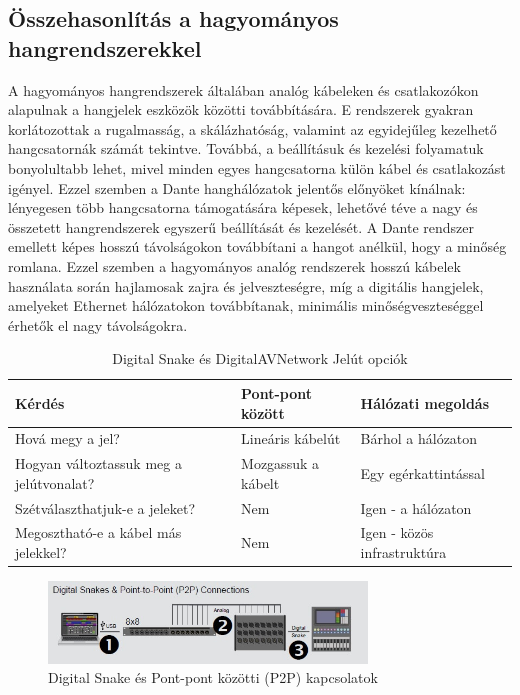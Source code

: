 \subsection{Összehasonlítás a hagyományos hangrendszerekkel}
A hagyományos hangrendszerek általában analóg kábeleken és csatlakozókon alapulnak 
a hangjelek eszközök közötti továbbítására. E rendszerek gyakran korlátozottak 
a rugalmasság, a skálázhatóság, valamint az egyidejűleg kezelhető hangcsatornák 
számát tekintve. Továbbá, a beállításuk és kezelési folyamatuk bonyolultabb lehet, 
mivel minden egyes hangcsatorna külön kábel és csatlakozást igényel. Ezzel szemben 
a Dante hanghálózatok jelentős előnyöket kínálnak: lényegesen több hangcsatorna 
támogatására képesek, lehetővé téve a nagy és összetett hangrendszerek egyszerű 
beállítását és kezelését. A Dante rendszer emellett képes hosszú távolságokon 
továbbítani a hangot anélkül, hogy a minőség romlana. Ezzel szemben a hagyományos 
analóg rendszerek hosszú kábelek használata során hajlamosak zajra és jelveszteségre, 
míg a digitális hangjelek, amelyeket Ethernet hálózatokon továbbítanak, minimális 
minőségveszteséggel érhetők el nagy távolságokra.
\begin{table}[htbp]
    \centering
    \caption{Digital Snake és DigitalAVNetwork Jelút opciók}
    \begin{tabular}{@{}lll@{}}
        \toprule
        \textbf{Kérdés} & \textbf{Pont-pont között} & \textbf{Hálózati megoldás} \\ \midrule
        Hová megy a jel? & Lineáris kábelút & Bárhol a hálózaton \\
        Hogyan változtassuk meg a jelútvonalat? & Mozgassuk a kábelt & Egy egérkattintással \\
        Szétválaszthatjuk-e a jeleket? & Nem & Igen - a hálózaton \\
        Megosztható-e a kábel más jelekkel? & Nem & Igen - közös infrastruktúra \\
        \bottomrule
    \end{tabular}
    \label{tab:digital-snake-vs-digitalavnetwork-hu}
\end{table}
\begin{figure}[H]
	\centering
	\includegraphics[width=320px, keepaspectratio]{figures/dsnake-p2p.jpg}
	\caption{Digital Snake és Pont-pont közötti (P2P) kapcsolatok}
	\label {fig:dsnake-p2p}
\end{figure}
